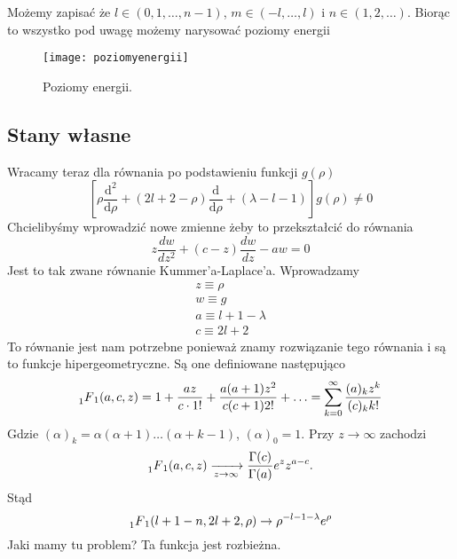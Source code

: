 Możemy zapisać że $ l\in(0,1,\ldots,n-1) $, $ m\in(-l,\ldots,l) $ i $n\in(1, 2, \dotsc)$. Biorąc to wszystko pod uwagę możemy narysować poziomy energii
\begin{figure}[H]
	\centering
	\texttt{[image: poziomyenergii]}
	\caption{Poziomy energii.}
	\label{fig:poziomyenergii}
\end{figure}
\subsection{Stany własne}
Wracamy teraz dla równania po podstawieniu funkcji $g(\rho)$
\begin{equation*}
	\left[\rho\frac{\text{d}^{2}}{\text{d} \rho}+(2l + 2 - \rho)\frac{\text{d}}{\text{d} \rho} + (\lambda - l - 1)\right] g(\rho)\neq0
\end{equation*}
Chcielibyśmy wprowadzić nowe zmienne żeby to przekształcić do równania
\begin{equation*}
	z \frac{d w}{d z^{2}}+(c-z) \frac{d w}{d z}-a w=0 
\end{equation*}
Jest to tak zwane równanie Kummer'a-Laplace'a. Wprowadzamy
\begin{equation*}
	\begin{gathered}
		z \equiv \rho \\
		w \equiv g \\
		a \equiv l + 1 - \lambda \\
		c \equiv 2l + 2
	\end{gathered}
\end{equation*}
To równanie jest nam potrzebne ponieważ znamy rozwiązanie tego równania i są
to funkcje hipergeometryczne. Są one definiowane następująco
\begin{equation*}
	\prescript{}{1}{F}_{1}(a, c, z)=1+\frac{a z}{c\cdot1!}+\frac{a(a+1) z^{2}}{c(c+1) 2!}+\ldots=\sum_{k=0}^{\infty} \frac{(a)_{k} z^{k}}{(c)_{k} k!}
\end{equation*}
Gdzie $(\alpha)_k = \alpha (\alpha+1)\dotsc(\alpha+k-1)$, $(\alpha)_0=1$.
Przy $z \to \infty$ zachodzi
\begin{equation*}
	\prescript{}{1}{F}_{1}(a, c, z) \xrightarrow[z \to \infty]{} \frac{\Gamma(c)}{\Gamma(a)}e^z z^{a-c}.
\end{equation*}
Stąd
\begin{equation*}
	\prescript{}{1}{F}_{1}(l + 1 - n, 2l+2, \rho) \rightarrow \rho^{-l-1-\lambda} e^{\rho}
\end{equation*}
Jaki mamy tu problem? Ta funkcja jest rozbieżna.
